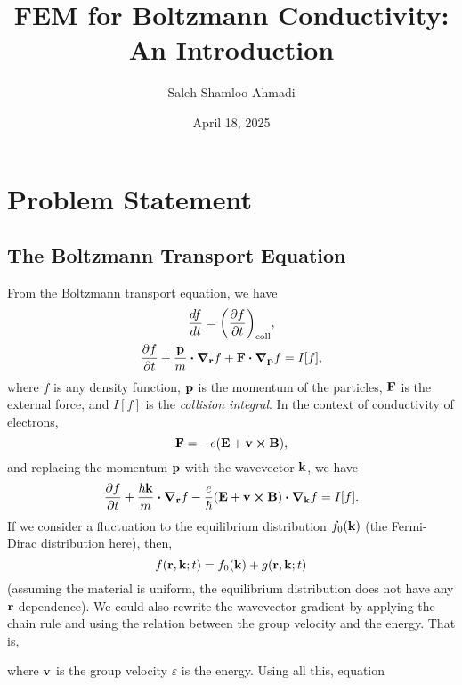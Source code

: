 \documentclass[12pt]{article}
\title{FEM for Boltzmann Conductivity: An Introduction}
\author{Saleh Shamloo Ahmadi}
\date{April 18, 2025}
\begin{document}
\maketitle
\section{Problem Statement}
\subsection{The Boltzmann Transport Equation}
From the Boltzmann transport equation, we have
\begin{gather}
    \dv{f}{t} = \qty(\pdv{f}{t})_{\text{coll}}, \\
    \pdv{f}{t} + \frac{\vb{p}}{m}\vdot\grad_{\vb{r}} f + \vb{F}\vdot\grad_{\vb{p}}f = I[f],
\end{gather}
where $f$ is any density function, $\vb{p}$ is the momentum of the particles, $\vb{F}$ is the
external force, and $I[f]$ is the \emph{collision integral}. In the context of conductivity of
electrons,
\begin{equation}
    \vb{F} = -e\qty(\vb{E} + \vb{v}\cross\vb{B}),
\end{equation}
and replacing the momentum $\vb{p}$ with the wavevector $\vb{k}$, we have
\begin{equation}
    \pdv{f}{t} + \frac{\hbar\vb{k}}{m}\vdot\grad_{\vb{r}} f
    - \frac{e}{\hbar}\qty(\vb{E} + \vb{v}\cross\vb{B})\vdot\grad_{\vb{k}}f = I[f].
    \label{eq:boltzmann_general}
\end{equation}
If we consider a fluctuation to the equilibrium distribution $f_0(\vb{k})$ (the Fermi-Dirac
distribution here), then,
\begin{equation}
    f(\vb{r}, \vb{k}; t) = f_0(\vb{k}) + g(\vb{r}, \vb{k}; t)
\end{equation}
(assuming the material is uniform, the equilibrium distribution does not have any $\vb{r}$
dependence). We could also rewrite the wavevector gradient by applying the chain rule and using
the relation between the group velocity and the energy. That is,
where $\vb{v}$ is the group velocity $\varepsilon$ is the energy. Using all this, equation
\end{document}
